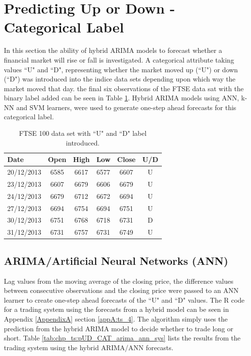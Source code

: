 



\section{Predicting Up or Down - Categorical Label}
\label{sec:pred:ud}
In this section the ability of hybrid ARIMA models to forecast whether a financial market will rise or fall is investigated. A categorical attribute taking values \textquotedblleft U" and \textquotedblleft D", representing whether the market moved up (\textquotedblleft U") or down (\textquotedblleft D")  was introduced into the indice data sets depending upon which way the market moved that day. the final six observations of the FTSE data sat with the binary label added can be seen in Table \ref{tab:chp_ts:ftse_100_fcast_ud}. Hybrid ARIMA models using ANN, k-NN and SVM learners, were used to generate one-step ahead forecasts for this categorical label.

\begin{table}[ht]
\centering
\caption[FTSE 100 data set with \textquotedblleft U" and \textquotedblleft D" label]{FTSE 100 data set with \textquotedblleft U" and \textquotedblleft D" label introduced.} 
\label{tab:chp_ts:ftse_100_fcast_ud}
\begin{tabular}{lccccc}
  \toprule Date & Open & High & Low & Close & U/D \\ 
  \midrule 20/12/2013 & 6585 & 6617 & 6577 & 6607 & U \\ 
  23/12/2013 & 6607 & 6679 & 6606 & 6679 & U \\ 
  24/12/2013 & 6679 & 6712 & 6672 & 6694 & U \\ 
  27/12/2013 & 6694 & 6754 & 6694 & 6751 & U \\ 
  30/12/2013 & 6751 & 6768 & 6718 & 6731 & D \\ 
  31/12/2013 & 6731 & 6757 & 6731 & 6749 & U \\ 
   \bottomrule \end{tabular}
\end{table}

\newpage
\subsection{ARIMA/Artificial Neural Networks (ANN)}
\label{sec:ann:ud}
Lag values from the moving average of the closing price, the difference values between consecutive observations and the closing price were passed to an ANN learner to create one-step ahead forecasts of the \textquotedblleft U" and \textquotedblleft D" values. The R code for a trading system using the forecasts from a hybrid model can be seen in Appendix \ref{AppendixA} section \ref{appA:ts_4}. The algorithm simply uses the prediction from the hybrid ARIMA model to decide whether to trade long or short. Table \ref{tab:chp_ts:pUD_CAT_arima_ann_sys} lists the results from the trading system using the hybrid ARIMA/ANN forecasts.

